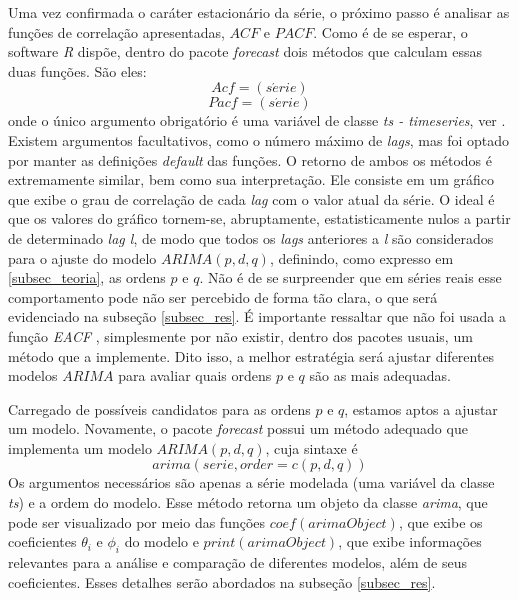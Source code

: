 \documentclass[12pt]{article}
\begin{document}
Uma vez confirmada o caráter estacionário da série, o próximo passo é analisar as funções de correlação apresentadas, $ACF$ e $PACF$. Como é de se esperar, o software \emph{R} dispõe, dentro do pacote \emph{forecast} dois métodos que calculam essas duas funções. São eles:
\begin{equation*}
Acf=(s\acute{e}rie)
\end{equation*}
\begin{equation*}
Pacf=(s\acute{e}rie)
\end{equation*}
onde o único argumento obrigatório é uma variável de classe \emph{ts - timeseries}, ver \cite{CRANR}. Existem argumentos facultativos, como o número máximo de \textit{lags}, mas foi optado por manter as definições \textit{default} das funções. O retorno de ambos os métodos é extremamente similar, bem como sua interpretação. Ele consiste em um gráfico que exibe o grau de correlação de cada \textit{lag} com o valor atual da série. O ideal é que os valores do gráfico tornem-se, abruptamente, estatisticamente nulos a partir de determinado \textit{lag l}, de modo que todos os \textit{lags} anteriores a \textit{l} são considerados para o ajuste do modelo $ARIMA(p,d,q)$, definindo, como expresso em \ref{subsec_teoria}, as ordens $p$ e $q$. Não é de se surpreender que em séries reais esse comportamento pode não ser percebido de forma tão clara, o que será evidenciado na subseção \ref{subsec_res}. É importante ressaltar que não foi usada a função \emph{EACF} \cite{Tsay-Tiao1984}, simplesmente por não existir, dentro dos pacotes usuais, um método que a implemente. Dito isso, a melhor estratégia será ajustar diferentes modelos $ARIMA$ para avaliar quais ordens $p$ e $q$ são as mais adequadas.

Carregado de possíveis candidatos para as ordens $p$ e $q$, estamos aptos a ajustar um modelo. Novamente, o pacote \emph{forecast} possui um método adequado que implementa um modelo $ARIMA(p,d,q)$, cuja sintaxe é
\begin{equation*}
arima(serie, order = c(p,d,q))
\end{equation*}
Os argumentos necessários são apenas a série modelada (uma variável da classe \textit{ts}) e a ordem do modelo. Esse método retorna um objeto da classe \textit{arima}, que pode ser visualizado por meio das funções $coef(arimaObject)$, que exibe os coeficientes $\theta_{i}$ e $\phi_{i}$ do modelo e $print(arimaObject)$, que exibe informações relevantes para a análise e comparação de diferentes modelos, além de seus coeficientes. Esses detalhes serão abordados na subseção \ref{subsec_res}.
\end{document}
